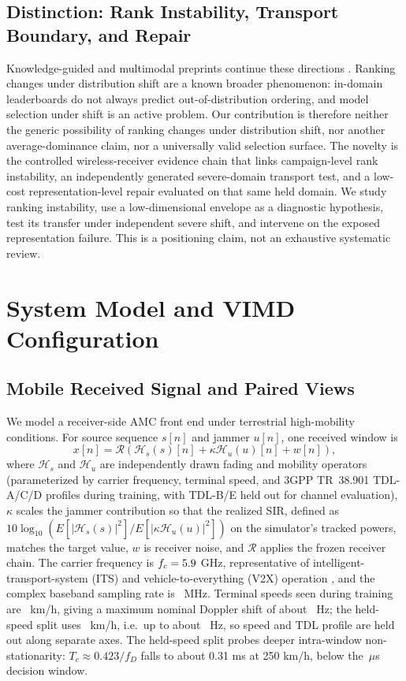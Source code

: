\documentclass[letterpaper,journal]{IEEEtran}
\begin{document}
\subsection{Distinction: Rank Instability, Transport Boundary, and Repair}
Knowledge-guided and multimodal preprints continue these directions
\cite{dkdnet2026preprint,moeformer2026preprint,zoomspec2026preprint,
rismae2025preprint}. Ranking changes under distribution shift are a known
broader phenomenon: in-domain leaderboards do not always predict
out-of-distribution ordering, and model selection under shift is an active
problem. Our contribution is therefore neither the generic possibility of
ranking changes under distribution shift, nor another average-dominance claim,
nor a universally valid selection surface. The novelty is the controlled
wireless-receiver evidence chain that links campaign-level rank instability,
an independently generated severe-domain transport test, and a low-cost
representation-level repair evaluated on that same held domain. We study
ranking instability, use a low-dimensional envelope as a diagnostic
hypothesis, test its transfer under independent severe shift, and intervene on
the exposed representation failure. This is a positioning claim, not an
exhaustive systematic review.

\section{System Model and VIMD Configuration}
\subsection{Mobile Received Signal and Paired Views}
We model a receiver-side AMC front end under terrestrial high-mobility
conditions. For source sequence $s[n]$ and jammer $u[n]$, one received window is
\begin{equation}
x[n]=\mathcal{R}\!\left(\mathcal{H}_s(s)[n]
+\kappa\mathcal{H}_u(u)[n]+w[n]\right),
\label{eq:rx}
\end{equation}
where $\mathcal{H}_s$ and $\mathcal{H}_u$ are independently drawn fading and
mobility operators (parameterized by carrier frequency, terminal speed, and
3GPP TR~38.901 \cite{3gpp38901} TDL-A/C/D profiles during training, with
TDL-B/E held out for channel evaluation), $\kappa$ scales the jammer
contribution so that the realized SIR, defined as
$10\log_{10}\!\left(E[|\mathcal{H}_s(s)|^2]/E[|\kappa\mathcal{H}_u(u)|^2]\right)$
on the simulator's tracked powers, matches the target value, $w$ is
receiver noise, and $\mathcal{R}$ applies the frozen receiver chain. The
carrier frequency is $f_c=5.9$ GHz, representative of
intelligent-transport-system (ITS) and vehicle-to-everything (V2X) operation
\cite{3gpp37885}, and the complex baseband
sampling rate is \SampleRateMHz\ MHz. Terminal speeds seen during training are
\SeenSpeeds\ km/h, giving a maximum nominal Doppler shift of about
\MaxDopplerSeenHz\ Hz; the held-speed split uses \HeldSpeeds\ km/h, i.e.\ up to
about \MaxDopplerHeldHz\ Hz, so speed and TDL profile are held out along
separate axes. The held-speed split probes deeper intra-window
non-stationarity: $T_c\approx0.423/f_D$ falls to about 0.31 ms at 250 km/h,
below the \WindowMicroseconds\,$\mu$s decision window.
\end{document}
